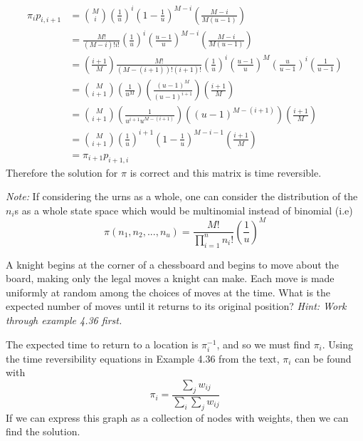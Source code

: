 \documentclass[10pt,a4paper]{exam}
\begin{document}
\begin{questions}
\begin{solution}
\begin{align*}
\pi_i p_{i,i+1}		&= \binom{M}{i}\left(\frac{1}{u}\right)^i \left(1 - \frac{1}{u}\right)^{M-i} \left( \frac{M-i}{M(u-1)}\right)\\
						&= \frac{M!}{(M-i)!i!} \left(\frac{1}{u}\right)^i \left(\frac{u-1}{u}\right)^{M-i} \left( \frac{M-i}{M(u-1)}\right)\\
						&= \left(\frac{i+1}{M}\right)\frac{M!}{(M-(i+1))!(i+1)!}\left(\frac{1}{u}\right)^i \left(\frac{u-1}{u}\right)^{M}\left(\frac{u}{u-1}\right)^i \left(\frac{1}{u-1}\right)\\
						&= \binom{M}{i+1} \left(\frac{1}{u^M}\right) \left(\frac{(u-1)^M}{(u-1)^{i+1}}\right)\left(\frac{i+1}{M}\right)\\
						&= \binom{M}{i+1} \left(\frac{1}{u^{i+1}u^{M-(i+1)}}\right) \left((u-1)^{M-(i+1)}\right) \left(\frac{i+1}{M}\right)\\
						&= \binom{M}{i+1} \left(\frac{1}{u}\right)^{i+1} \left(1 - \frac{1}{u}\right)^{M-i-1} \left(\frac{i+1}{M}\right)\\
						&= \pi_{i+1} p_{i+1,i}
\end{align*}
Therefore the solution for $\pi$ is correct and this matrix is time reversible.

\textit{Note:} If considering the urns as a whole, one can consider the distribution of the $n_i$s as a whole state space which would be multinomial instead of binomial (i.e)
$$\pi(n_1, n_2, ..., n_u) = \frac{M!}{\prod_{i=1}^n n_i!} \left(\frac{1}{u}\right)^M$$
\end{solution}

\pagebreak

\question A knight begins at the corner of a chessboard and begins to move about the board, making only the legal moves a knight can make. Each move is made uniformly at random among the choices of moves at the time. What is the expected number of moves until it returns to its original position? \textit{Hint: Work through example 4.36 first.}

\begin{solution}
The expected time to return to a location is $\pi_i^{-1}$, and so we must find $\pi_i$. Using the time reversibility equations in Example 4.36 from the text, $\pi_i$ can be found with 
$$\pi_i = \frac{\sum_j w_{ij}}{\sum_i\sum_j w_{ij}}$$
If we can express this graph as a collection of nodes with weights, then we can find the solution. 


\end{solution}
\end{questions}
\end{document}
